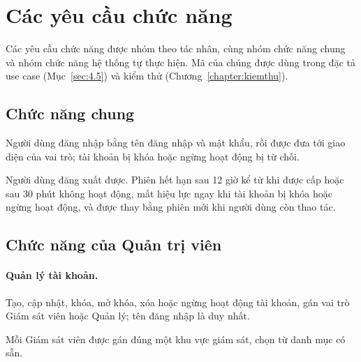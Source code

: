 \section{Các yêu cầu chức năng}
\label{sec:4.2}

Các yêu cầu chức năng được nhóm theo tác nhân, cùng nhóm chức năng chung và nhóm chức năng hệ thống tự thực hiện. Mã của chúng được dùng trong đặc tả use case (Mục~\ref{sec:4.5}) và kiểm thử (Chương~\ref{chapter:kiemthu}).

\subsection{Chức năng chung}
\label{sec:4.2.1}

\begin{reqlist}
    \item[FR-C01] Người dùng đăng nhập bằng tên đăng nhập và mật khẩu, rồi được đưa tới giao diện của vai trò; tài khoản bị khóa hoặc ngừng hoạt động bị từ chối.
    \item[FR-C02] Người dùng đăng xuất được. Phiên hết hạn sau 12 giờ kể từ khi được cấp hoặc sau 30 phút không hoạt động, mất hiệu lực ngay khi tài khoản bị khóa hoặc ngừng hoạt động, và được thay bằng phiên mới khi người dùng còn thao tác.
\end{reqlist}

\subsection{Chức năng của Quản trị viên}
\label{sec:4.2.2}

\paragraph{Quản lý tài khoản.}
\begin{reqlist}
    \item[FR-A01] Tạo, cập nhật, khóa, mở khóa, xóa hoặc ngừng hoạt động tài khoản, gán vai trò Giám sát viên hoặc Quản lý; tên đăng nhập là duy nhất.
    \item[FR-A02] Mỗi Giám sát viên được gán đúng một khu vực giám sát, chọn từ danh mục có sẵn.
\end{reqlist}

